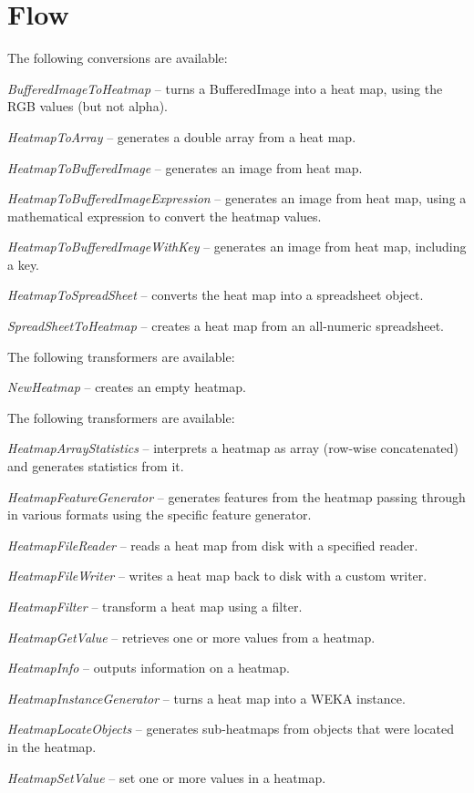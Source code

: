 \documentclass[a4paper]{book}
\begin{document}
\chapter{Flow}
The following conversions are available:
\begin{tight_itemize}
  	\item \textit{BufferedImageToHeatmap} -- turns a BufferedImage into a heat
  	map, using the RGB values (but not alpha).
  	\item \textit{HeatmapToArray} -- generates a double array from a heat map.
  	\item \textit{HeatmapToBufferedImage} -- generates an image from heat map.
  	\item \textit{HeatmapToBufferedImageExpression} -- generates an image
  	from heat map, using a mathematical expression to convert the heatmap values.
  	\item \textit{HeatmapToBufferedImageWithKey} -- generates an image from heat
  	map, including a key.
  	\item \textit{HeatmapToSpreadSheet} -- converts the heat map into a
  	spreadsheet object.
  	\item \textit{SpreadSheetToHeatmap} -- creates a heat map from an all-numeric
  	spreadsheet.
\end{tight_itemize}
The following transformers are available:
\begin{tight_itemize}
  	\item \textit{NewHeatmap} -- creates an empty heatmap.
\end{tight_itemize}
The following transformers are available:
\begin{tight_itemize}
  	\item \textit{HeatmapArrayStatistics} -- interprets a heatmap as array
  	(row-wise concatenated) and generates statistics from it.
  	\item \textit{HeatmapFeatureGenerator} -- generates features from the
  	heatmap passing through in various formats using the specific feature
  	generator.
  	\item \textit{HeatmapFileReader} -- reads a heat map from disk with a
  	specified reader.
  	\item \textit{HeatmapFileWriter} -- writes a heat map back to disk with
  	a custom writer.
  	\item \textit{HeatmapFilter} -- transform a heat map using a filter.
  	\item \textit{HeatmapGetValue} -- retrieves one or more values from a heatmap.
  	\item \textit{HeatmapInfo} -- outputs information on a heatmap.
  	\item \textit{HeatmapInstanceGenerator} -- turns a heat map into a WEKA
  	instance.
  	\item \textit{HeatmapLocateObjects} -- generates sub-heatmaps from objects
  	that were located in the heatmap.
  	\item \textit{HeatmapSetValue} -- set one or more values in a heatmap.
\end{tight_itemize}
\end{document}

